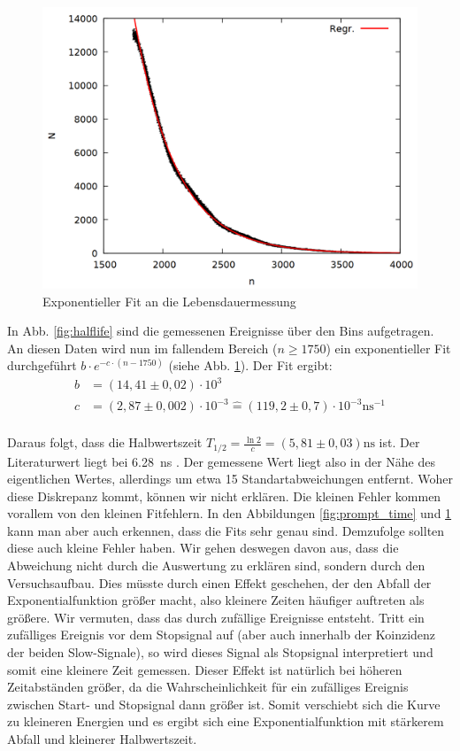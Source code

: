 \begin{figure}
\centering
\includegraphics[width=0.7\linewidth]{data/uebernacht2.png}
\caption{Exponentieller Fit an die Lebensdauermessung}
\label{fig:halflife2}
\end{figure}

In Abb. \ref{fig:halflife} sind die gemessenen Ereignisse über den Bins aufgetragen. An diesen Daten wird nun im fallendem Bereich ($n \geq 1750$) ein exponentieller Fit durchgeführt $b\cdot e^{-c\cdot (n-1750)}$ (siehe Abb. \ref{fig:halflife2}). Der Fit ergibt:
\begin{align*}
b &= (14,41 \pm 0,02) \cdot 10^3\\
c &= (2,87 \pm 0,002) \cdot 10^{-3} \mathrel{\widehat{=}} (119,2 \pm 0,7)\cdot 10^{-3} \si{\nano\second}^{-1}\\
\end{align*}

Daraus folgt, dass die Halbwertszeit $T_{1/2} = \frac{\ln{2}}{c} = (5,81 \pm 0,03) \si{\nano\second}$ ist. Der Literaturwert liegt bei \SI{6,28}{\nano\second} \cite{cs133}. Der gemessene Wert liegt also in der Nähe des eigentlichen Wertes, allerdings um etwa 15 Standartabweichungen entfernt. Woher diese Diskrepanz kommt, können wir nicht erklären. Die kleinen Fehler kommen vorallem von den kleinen Fitfehlern. In den Abbildungen \ref{fig:prompt_time} und \ref{fig:halflife2} kann man aber auch erkennen, dass die Fits sehr genau sind. Demzufolge sollten diese auch kleine Fehler haben. Wir gehen deswegen davon aus, dass die Abweichung nicht durch die Auswertung zu erklären sind, sondern durch den Versuchsaufbau. Dies müsste durch einen Effekt geschehen, der den Abfall der Exponentialfunktion größer macht, also kleinere Zeiten häufiger auftreten als größere. Wir vermuten, dass das durch zufällige Ereignisse entsteht. Tritt ein zufälliges Ereignis vor dem Stopsignal auf (aber auch innerhalb der Koinzidenz der beiden Slow-Signale), so wird dieses Signal als Stopsignal interpretiert und somit eine kleinere Zeit gemessen. Dieser Effekt ist natürlich bei höheren Zeitabständen größer, da die Wahrscheinlichkeit für ein zufälliges Ereignis zwischen Start- und Stopsignal dann größer ist. Somit verschiebt sich die Kurve zu kleineren Energien und es ergibt sich eine Exponentialfunktion mit stärkerem Abfall und kleinerer Halbwertszeit. 